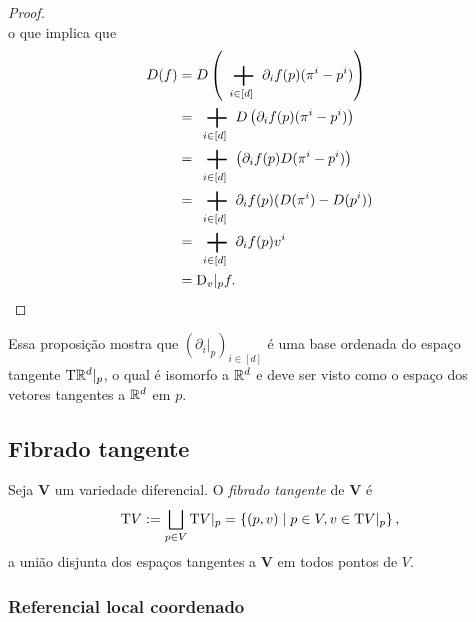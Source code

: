 \begin{proof}
\begin{equation*}
	\end{equation*}
o que implica que
	\begin{align*}
	D(f) &= D\left( \sum_{i \in [d]} \partial_i f(p) (\pi^i-p^i) \right) \\
		&= \sum_{i \in [d]} D\left( \partial_i f(p) (\pi^i-p^i) \right) \\
		&= \sum_{i \in [d]} \left( \partial_i f(p) D(\pi^i-p^i) \right) \\
		&= \sum_{i \in [d]} \partial_i f(p) (D(\pi^i)-D(p^i)) \\
		&= \sum_{i \in [d]} \partial_i f(p) v^i \\
		&= \D_v|_p f.
	\end{align*}
\end{proof}

Essa proposição mostra que $\left( \partial_i|_p \right)_{i \in [d]}$ é uma base ordenada do espaço tangente $\mathrm{T} \mathbb{R}^d|_p$, o qual é isomorfo a $\mathbb{R}^d$ e deve ser visto como o espaço dos vetores tangentes a $\mathbb{R}^d$ em $p$.

\subsection{Fibrado tangente}

\begin{definition}
Seja $\bm V$ um variedade diferencial. O \emph{fibrado tangente} de $\bm V$ é
	\begin{equation*}
	\mathrm{T} V := \bigsqcup_{p \in V} \mathrm{T} V|_p = \left\{{(p,v)}\;\middle\vert\;{p \in V,v \in \mathrm{T} V|_p}\right\},
	\end{equation*}
a união disjunta dos espaços tangentes a $\bm V$ em todos pontos de $V$.
\end{definition}

\subsubsection{Referencial local coordenado}

